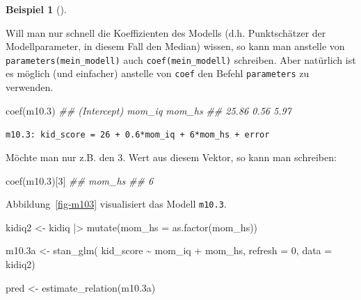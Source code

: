 \documentclass[
  ngerman,
  letterpaper,
  twoside,
  open=any]{scrbook}
\newenvironment{Shaded}{\begin{snugshade}}{\end{snugshade}}
\newcommand{\AttributeTok}[1]{\textcolor[rgb]{0.40,0.45,0.13}{#1}}
\newcommand{\DecValTok}[1]{\textcolor[rgb]{0.68,0.00,0.00}{#1}}
\newcommand{\DocumentationTok}[1]{\textcolor[rgb]{0.37,0.37,0.37}{\textit{#1}}}
\newcommand{\FloatTok}[1]{\textcolor[rgb]{0.68,0.00,0.00}{#1}}
\newcommand{\FunctionTok}[1]{\textcolor[rgb]{0.28,0.35,0.67}{#1}}
\newcommand{\NormalTok}[1]{\textcolor[rgb]{0.00,0.23,0.31}{#1}}
\newcommand{\OtherTok}[1]{\textcolor[rgb]{0.00,0.23,0.31}{#1}}
\newcommand{\SpecialCharTok}[1]{\textcolor[rgb]{0.37,0.37,0.37}{#1}}
\theoremstyle{definition}
\newtheorem{example}{Beispiel}[chapter]
\theoremstyle{plain}
\theoremstyle{definition}
\theoremstyle{definition}
\theoremstyle{remark}
\begin{document}
\begin{example}[]
{\begin{longtable}[]
\end{longtable}

}

Will man nur schnell die Koeffizienten des Modells (d.h. Punktschätzer
der Modellparameter, in diesem Fall den Median) wissen, so kann man
anstelle von \texttt{parameters(mein\_modell)} auch
\texttt{coef(mein\_modell)} schreiben. Aber natürlich ist es möglich
(und einfacher) anstelle von \texttt{coef} den Befehl
\texttt{parameters} zu verwenden.

\begin{Shaded}
\begin{Highlighting}[]
\FunctionTok{coef}\NormalTok{(m10}\FloatTok{.3}\NormalTok{)}
\DocumentationTok{\#\# (Intercept)      mom\_iq      mom\_hs }
\DocumentationTok{\#\#       25.86        0.56        5.97}
\end{Highlighting}
\end{Shaded}

\texttt{m10.3:\ kid\_score\ =\ 26\ +\ 0.6*mom\_iq\ +\ 6*mom\_hs\ +\ error}

Möchte man nur z.B. den 3. Wert aus diesem Vektor, so kann man
schreiben:

\begin{Shaded}
\begin{Highlighting}[]
\FunctionTok{coef}\NormalTok{(m10}\FloatTok{.3}\NormalTok{)[}\DecValTok{3}\NormalTok{]}
\DocumentationTok{\#\# mom\_hs }
\DocumentationTok{\#\#      6}
\end{Highlighting}
\end{Shaded}

Abbildung~\ref{fig-m103} visualisiert das Modell \texttt{m10.3}.

\begin{Shaded}
\begin{Highlighting}[]
\NormalTok{kidiq2 }\OtherTok{\textless{}{-}}
\NormalTok{  kidiq }\SpecialCharTok{|\textgreater{}} 
  \FunctionTok{mutate}\NormalTok{(}\AttributeTok{mom\_hs =} \FunctionTok{as.factor}\NormalTok{(mom\_hs))}

\NormalTok{m10}\FloatTok{.3}\NormalTok{a }\OtherTok{\textless{}{-}} 
  \FunctionTok{stan\_glm}\NormalTok{(}
\NormalTok{    kid\_score }\SpecialCharTok{\textasciitilde{}}\NormalTok{ mom\_iq }\SpecialCharTok{+}\NormalTok{ mom\_hs, }
    \AttributeTok{refresh =} \DecValTok{0}\NormalTok{,}
    \AttributeTok{data =}\NormalTok{ kidiq2)}

\NormalTok{pred }\OtherTok{\textless{}{-}} \FunctionTok{estimate\_relation}\NormalTok{(m10}\FloatTok{.3}\NormalTok{a)}


\end{Highlighting}
\end{Shaded}
\end{example}
\end{document}
